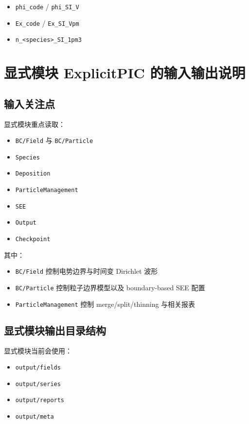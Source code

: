 \documentclass[11pt,a4paper]{ctexart}
\newcommand{\code}[1]{\texttt{#1}}
\newcommand{\dir}[1]{\texttt{#1}}
\begin{document}
\begin{itemize}
  \item \code{phi\_code} / \code{phi\_SI\_V}
  \item \code{Ex\_code} / \code{Ex\_SI\_Vpm}
  \item \code{n\_<species>\_SI\_1pm3}
\end{itemize}

\section{显式模块 ExplicitPIC 的输入输出说明}

\subsection{输入关注点}

显式模块重点读取：

\begin{itemize}
  \item \code{BC/Field} 与 \code{BC/Particle}
  \item \code{Species}
  \item \code{Deposition}
  \item \code{ParticleManagement}
  \item \code{SEE}
  \item \code{Output}
  \item \code{Checkpoint}
\end{itemize}

其中：

\begin{itemize}
  \item \code{BC/Field} 控制电势边界与时间变 Dirichlet 波形
  \item \code{BC/Particle} 控制粒子边界模型以及 boundary-based SEE 配置
  \item \code{ParticleManagement} 控制 merge/split/thinning 与相关报表
\end{itemize}

\subsection{显式模块输出目录结构}

显式模块当前会使用：

\begin{itemize}
  \item \dir{output/fields}
  \item \dir{output/series}
  \item \dir{output/reports}
  \item \dir{output/meta}
\end{itemize}
\end{document}

